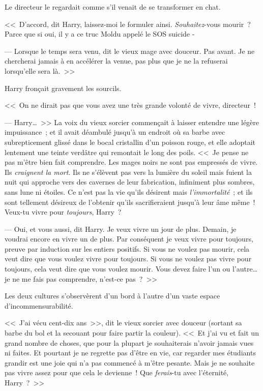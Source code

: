 Le directeur le regardait comme s'il venait de se transformer en chat.

<<~D'accord, dit Harry, laissez-moi le formuler ainsi. \emph{Souhaitez}-vous mourir~? Parce que si oui, il y a ce truc Moldu appelé le SOS suicide -

--- Lorsque le temps sera venu, dit le vieux mage avec douceur. Pas avant. Je ne chercherai jamais à en accélérer la venue, pas plus que je ne la refuserai lorsqu'elle sera là.~>>

Harry fronçait gravement les sourcils.

<<~On ne dirait pas que vous avez une très grande volonté de vivre, directeur~!

--- Harry…~>> La voix du vieux sorcier commençait à laisser entendre une légère impuissance~; et il avait déambulé jusqu'à un endroit où sa barbe avec subrepticement glissé dans le bocal cristallin d'un poisson rouge, et elle adoptait lentement une teinte verdâtre qui remontait le long des poils. <<~Je pense ne pas m'être bien fait comprendre. Les mages noirs ne sont pas empressés de vivre. Ils \emph{craignent la mort}. Ils ne s'élèvent pas vers la lumière du soleil mais fuient la nuit qui approche vers des cavernes de leur fabrication, infiniment plus sombres, sans lune ni étoiles. Ce n'est pas la vie qu'ils désirent mais \emph{l'immortalité}~; et ils sont tellement désireux de l'obtenir qu'ils sacrifieraient jusqu'à leur âme même~! Veux-tu vivre pour \emph{toujours}, Harry~?

--- Oui, et vous aussi, dit Harry. Je veux vivre un jour de plus. Demain, je voudrai encore en vivre un de plus. Par conséquent je veux vivre pour toujours, preuve par induction sur les entiers positifs. Si vous ne voulez pas mourir, cela veut dire que vous voulez vivre pour toujours. Si vous ne voulez pas vivre pour toujours, cela veut dire que vous voulez mourir. Vous devez faire l'un ou l'autre… je ne me fais pas comprendre, n'est-ce pas~?~>>

Les deux cultures s'observèrent d'un bord à l'autre d'un vaste espace d'incommensurabilité.

<<~J'ai vécu cent-dix ans~>>, dit le vieux sorcier avec douceur (sortant sa barbe du bol et la secouant pour faire partir la couleur). <<~Et j'ai vu et fait un grand nombre de choses, que pour la plupart je souhaiterais n'avoir jamais vues ni faites. Et pourtant je ne regrette pas d'être en vie, car regarder mes étudiants grandir est une joie qui n'a pas commencé à m'être pesante. Mais je ne souhaite pas vivre assez pour que cela le devienne~! Que \emph{ferais}-tu avec l'éternité, Harry~?~>>

